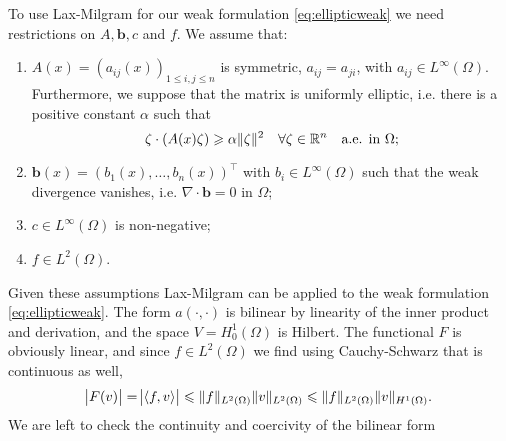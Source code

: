 \documentclass[thesis.tex]{subfiles}
\begin{document}
To use  Lax-Milgram for our weak formulation \eqref{eq:ellipticweak} we need restrictions on $A, \mathbf{b}, c$ and $f$. We assume that:
\begin{enumerate}[label=(\alph*)]
\item $A(x) = (a_{ij}(x))_{1 \leq i,j \leq n}$ is symmetric, $a_{ij} = a_{ji}$, with $a_{ij} \in L^{\infty}(\Omega)$. Furthermore, we suppose that the matrix is uniformly elliptic, i.e. there is a positive constant $\alpha$ such that 
\[
  \zeta \cdot (A(x) \zeta) \geqslant \alpha \|\zeta\|^2 \quad \forall \zeta \in \mathbb{R}^n \quad \text{a.e. in } \Omega;
\]
\item $\mathbf{b}(x) = \left(b_1(x), \dots, b_n(x)\right)^\top$ with $b_i \in L^\infty(\Omega)$ such that the weak divergence vanishes, i.e. $\nabla \cdot \mathbf{b} = 0$ in $\Omega$;
\item $c \in L^\infty(\Omega)$ is non-negative;
\item $f  \in L^2(\Omega)$.
\end{enumerate}
Given these assumptions Lax-Milgram can be applied to the weak formulation \eqref{eq:ellipticweak}. The form $a(\cdot, \cdot)$ is bilinear by linearity of the inner product and derivation, and the space $V = H_0^1(\Omega)$ is Hilbert. The functional $F$ is obviously linear, and since $f \in L^2(\Omega)$ we find using Cauchy-Schwarz that is continuous as well,
\[
  \abs{F(v)} = \abs{\left \langle f,v \right \rangle} \leqslant \|f\|_{L^2(\Omega)} \|v\|_{L^2(\Omega)} \leqslant \|f\|_{L^2(\Omega)} \|v\|_{H^1(\Omega)}.
\]
We are left to check the continuity and coercivity of the bilinear form
\end{document}
